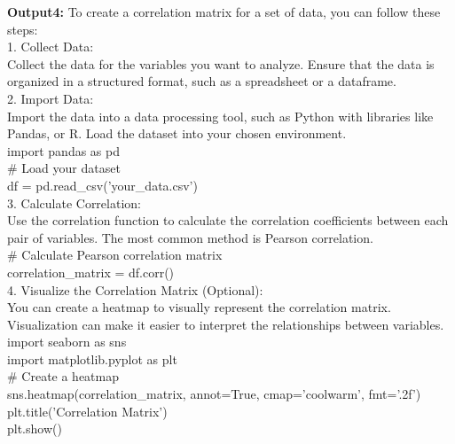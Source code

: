 \documentclass[UTF8]{ctexart} %
\begin{document}
\textbf{Output4:}
To create a correlation matrix for a set of data, you can follow these steps:\\
1.	Collect Data:\\
Collect the data for the variables you want to analyze. Ensure that the data is organized in a structured format, such as a spreadsheet or a dataframe.\\
2.	Import Data:\\
Import the data into a data processing tool, such as Python with libraries like Pandas, or R. Load the dataset into your chosen environment.\\
import pandas as pd\\
\# Load your dataset\\
df = pd.read\_csv('your\_data.csv')\\
3.	Calculate Correlation:\\
Use the correlation function to calculate the correlation coefficients between each pair of variables. The most common method is Pearson correlation.\\
\# Calculate Pearson correlation matrix\\
correlation\_matrix = df.corr()\\
4.	Visualize the Correlation Matrix (Optional):\\
You can create a heatmap to visually represent the correlation matrix. Visualization can make it easier to interpret the relationships between variables.\\
import seaborn as sns\\
import matplotlib.pyplot as plt\\
\# Create a heatmap\\
sns.heatmap(correlation\_matrix, annot=True, cmap='coolwarm', fmt='.2f')\\
plt.title('Correlation Matrix')\\
plt.show()\\
\end{document}
